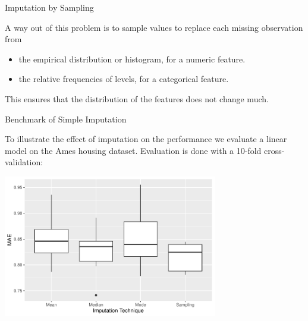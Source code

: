 \documentclass[11pt,compress,t,notes=noshow, xcolor=table]{beamer}
\begin{document}
\begin{frame}{Imputation by Sampling}

    A way out of this problem is to sample values to replace each missing observation from
    
    \begin{itemize}
        \item the empirical distribution or histogram, for a numeric feature.
        \item the relative frequencies of levels, for a categorical feature.
    \end{itemize}
    
    This ensures that the distribution of the features does not change much.

\end{frame}

\begin{frame}{Benchmark of Simple Imputation}

    To illustrate the effect of imputation on the performance we evaluate a linear model on the Ames housing dataset.
    Evaluation is done with a 10-fold cross-validation:
    
    \begin{center}
        \includegraphics[width=0.7\textwidth]{figure/imputation_benchmark_comparison}
    \end{center}

\end{frame}

\endlecture
\end{document}
